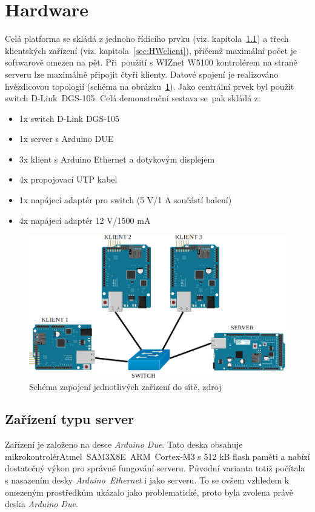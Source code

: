 \section{Hardware}
Celá platforma se skládá z jednoho řídicího prvku (viz. kapitola~\ref{sec:HWserver}) a třech klientských zařízení (viz. kapitola~\ref{sec:HWclient}), přičemž maximální počet je softwarově omezen na pět. Při~použití s WIZnet W5100 kontrolérem na straně serveru lze maximálně připojit čtyři klienty. Datové spojení je realizováno hvězdicovou topologií (schéma na obrázku~\ref{fig:schema_net}). Jako centrální prvek byl použit switch \mbox{D-Link DGS-105}.
Celá demonstrační sestava se~pak skládá z:
\begin{itemize}
  \item 1x switch D-Link DGS-105
  \item 1x server s Arduino DUE
  \item 3x klient s Arduino Ethernet a dotykovým displejem
  \item 4x propojovací UTP kabel
  \item 1x napájecí adaptér pro switch (5 V/1 A součástí balení)
  \item 4x napájecí adaptér 12 V/1500 mA
\end{itemize}

\begin{figure}[hbtp]
  \centering
  \includegraphics[width=12cm]{img/schema_net.png}
  \caption{\label{fig:schema_net} Schéma zapojení jednotlivých zařízení do sítě, zdroj \cite{fig_ArdEthernet, fig_ArdEthShield, fig_switchIco, fig_ArdDue}}
\end{figure}

\subsection{Zařízení typu server}
\label{sec:HWserver}
Zařízení je založeno na desce \textit{Arduino Due}. Tato deska  obsahuje mikrokontrolér\linebreak\mbox{Atmel SAM3X8E ARM Cortex-M3} s 512 kB flash paměti a nabízí dostatečný výkon pro správné fungování serveru. Původní varianta totiž počítala s nasazením desky \mbox{\textit{Arduino Ethernet}} i jako serveru. To se ovšem vzhledem k omezeným prostředkům ukázalo jako problematické, proto byla zvolena právě deska \textit{Arduino Due}.

